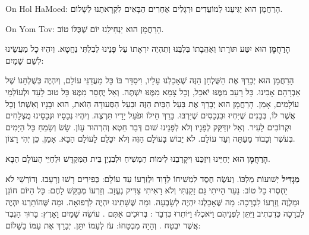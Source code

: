 \begin{seasonal}{On Hol HaMoed:}
הָרַחֲמָן הוּא יַגִּיעֵנוּ לְמוֹעֲדִים וּרְגָלִים אֲחֵרִים הַבָּאִים לִקְרָאתֵנוּ לְשָׁלוֹם.
\end{seasonal}

\begin{seasonal}{On Yom Tov:}
הָרַחֲמָן הוּא יַנְחִילֵנוּ יוֹם שֶׁכֻּלּוֹ טוֹב.
\end{seasonal}

\textbf{הָרַחֲמָן} הוּא יִטַּע תּוֹרָתוֹ וְאַהֲבָתוֹ בְּלִבֵּנוּ וְתִהְיֶה יִרְאָתוֹ עַל פָּנֵינוּ לְבִלְתִּי נֶחֱטָא. וְיִהְיוּ כָל מַעֲשֵׂינוּ לְשֵׁם שָׁמָיִם:

הָרַחֲמָן הוּא יְבָרֵךְ אֶת הַשֻּׁלְחָן הַזֶּה שֶׁאָכַלְנוּ עָלָיו, וִיסַדֵּר בּוֹ כָּל מַעֲדַנֵּי עוֹלָם, וְיִהְיֶה כְּשֻׁלְחָנוֹ שֶׁל אַבְרָהָם אָבִינוּ. כָּל רָעֵב מִמֶּנּוּ יֹאכַל, וְכָל צָמֵא מִמֶּנּוּ יִשְׁתֶּה. וְאַל יֶחְסַר מִמֶּנּוּ כָּל טוּב לָעַד וּלְעוֹלְמֵי עוֹלָמִים, אָמֵן. הָרַחֲמָן הוּא יְבָרֵךְ אֶת בַּעַל הַבַּיִת הַזֶּה וּבַעַל הַסְּעוּדָה הַזֹּאת, הוּא וּבָנָיו וְאִשְׁתּוֹ וְכָל אֲשֶׁר לוֹ, בְּבָנִים שֶׁיִּחְיוּ וּבִנְכָסִים שֶׁיִּרְבּוּ. בָּרֵךְ \Shem{} חֵילוֹ וּפֹעַל יָדָיו תִּרְצֶה. וְיִהְיוּ נְכָסָיו וּנְכָסֵינוּ מֻצְלָחִים וּקְרוֹבִים לָעִיר. וְאַל יִזְדַּקֵּק לְפָנָיו וְלֹא לְפָנֵינוּ שׁוּם דְּבַר חֵטְא וְהִרְהוּר עָוֹן. שָׂשׂ וְשָׂמֵחַ כָּל הַיָּמִים בְּעֹשֶׁר וְכָבוֹד מֵעַתָּה וְעַד עוֹלָם. לֹא יֵבוֹשׁ בָּעוֹלָם הַזֶּה וְלֹא יִכָּלֵם לָעוֹלָם הַבָּא. אָמֵן, כֵּן יְהִי רָצוֹן.

\textbf{הָרַחֲמָן} הוּא יְחַיֵּינוּ וִיזַכֵּנוּ וִיקָרְבֵנוּ לִימוֹת הַמָּשִׁיחַ וּלְבִנְיַן בֵּית הַמִּקְדָּשׁ וּלְחַיֵּי הָעוֹלָם הַבָּא.

\textbf{מַגְדִּיל} יְשׁוּעוֹת מַלְכּוֹ. וְעֹשֶׂה חֶסֶד לִמְשִׁיחוֹ לְדָוִד וּלְזַרְעוֹ עַד עוֹלָם: כְּפִירִים רָשׁוּ וְרָעֵבוּ. וְדוֹרְשֵׁי \Shem{} לֹא יַחְסְרוּ כָל טוֹב: נַעַר הָיִיתִי גַּם זָקַנְתִּי וְלֹא רָאִיתִי צַדִּיק נֶעֱזָב. וְזַרְעוֹ מְבַקֵּשׁ לָחֶם: כָּל הַיּוֹם חוֹנֵן וּמַלְוֶה וְזַרְעוֹ לִבְרָכָה: מַה שֶּׁאָכַלְנוּ יִהְיֶה לְשָׂבְעָה. וּמַה שֶּׁשָּׁתִינוּ יִהְיֶה לִרְפוּאָה. וּמַה שֶּׁהוֹתַרְנוּ יִהְיֶה לִבְרָכָה כְּדִכְתִיב וַיִּתֵּן לִפְנֵיהֶם וַיֹּאכְלוּ וַיּוֹתִרוּ כִּדְבַר \Shem{}: בְּרוּכִים אַתֶּם . עוֹשֵׂה שָׁמַיִם וָאָרֶץ: בָּרוּךְ הַגֶּבֶר אֲשֶׁר יִבְטַח . וְהָיָה \Shem{} מִבְטָחוֹ: \Shem{} עֹז לְעַמּוֹ יִתֵּן. \Shem{} יְבָרֵךְ אֶת עַמּוֹ בַשָּׁלוֹם:

